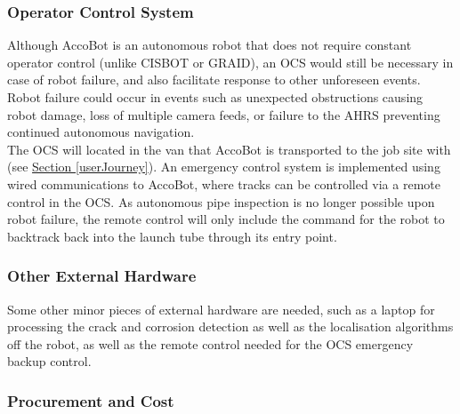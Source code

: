 \documentclass[11pt]{article}		%
\newcommand{\sectref}[1]{\hyperref[#1]{Section \ref*{#1}}}     %
\begin{document}
		\subsubsection{Operator Control System}
		
        Although AccoBot is an autonomous robot that does not require constant operator control (unlike CISBOT or GRAID), an OCS would still be necessary in case of robot failure, and also facilitate response to other unforeseen events. Robot failure could occur in events such as unexpected obstructions causing robot damage, loss of multiple camera feeds, or failure to the AHRS preventing continued autonomous navigation.
        \\
        \hspace*{2ex}The OCS will located in the van that AccoBot is transported to the job site with (see \sectref{userJourney}). An emergency control system is implemented using wired communications to AccoBot, where tracks can be controlled via a remote control in the OCS. As autonomous pipe inspection is no longer possible upon robot failure, the remote control will only include the command for the robot to backtrack back into the launch tube through its entry point.
        
    \subsubsection{Other External Hardware}
    
    Some other minor pieces of external hardware are needed, such as a laptop for processing the crack and corrosion detection as well as the localisation algorithms off the robot, as well as the remote control needed for the OCS emergency backup control. 
    
    \subsubsection{Procurement and Cost}
    
\end{document}
